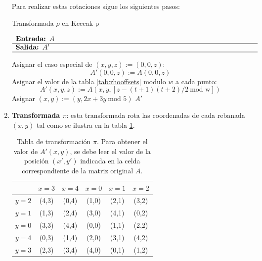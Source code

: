 \begin{enumerate}
	Para realizar estas rotaciones sigue los siguientes pasos:
	\begin{algorithm}[H]
		\caption{Transformada \(\rho\) en Keccak-p}
		$\begin{array}{p{\textwidth}}
			\textbf{Entrada: }\(A\) \\ 
			\hline
			\textbf{Salida: }\(A'\) \\ 
			\hline
		\end{array}$
		\begin{algorithmic}[1]
			\State Asignar el caso especial de \((x,y,z):=(0,0,z)\):
			\begin{equation}
				A'(0,0,z):=A(0,0,z)
			\end{equation}
			 
			\State Asignar el valor de la tabla \ref{tab:rhooffsets} modulo \(w\) a cada punto:
			\begin{equation}
				A'(x,y,z):=A(x,y,[z-(t+1)(t+2)/2 \ \text{mod w}])
			\end{equation}
			\State Asignar \((x,y):=(y,2x+3y \ \text{mod } 5)\)
			\EndFor
			\State \Return \(A'\)
		\end{algorithmic}
	\end{algorithm}
	\newpage
	\item \textbf{Transformada \(\pi\)}: esta transformada rota las coordenadas de cada rebanada \((x,y)\) tal como se ilustra en la tabla \ref{tab:piTransform}.
	
	\begin{table}[H]
		\centering
		\begin{tabular}{|c|c|c|c|c|c|}
					\hline
			& $x = 3$ & $x = 4$ & $x = 0$ & $x = 1$ & $x = 2$ \\
			\hline
			$y = 2$ & (4,3) & (0,4) & (1,0) & (2,1) & (3,2) \\
			\hline
			$y = 1$ & (1,3) & (2,4) & (3,0) & (4,1) & (0,2) \\
			\hline
			$y = 0$ & (3,3) & (4,4) & (0,0) & (1,1) & (2,2) \\
			\hline
			$y = 4$ & (0,3) & (1,4) & (2,0) & (3,1) & (4,2) \\
			\hline
			$y = 3$ & (2,3) & (3,4) & (4,0) & (0,1) & (1,2) \\
			\hline
		\end{tabular}
		\caption{Tabla de transformación $\pi$. Para obtener el valor de $A'(x,y)$, se debe leer el valor de la posición $(x',y')$ indicada en la celda correspondiente de la matriz original $A$.}
		\label{tab:piTransform}
	\end{table}
	

\end{enumerate}

